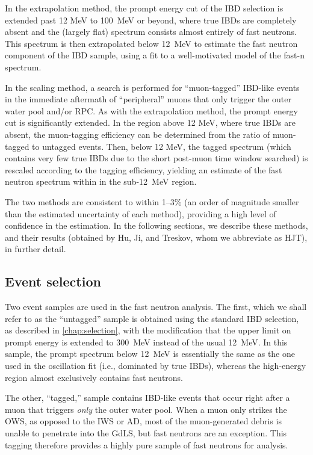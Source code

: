 \documentclass[../thesis.tex]{subfiles}
\begin{document}
In the extrapolation method, the prompt energy cut of the IBD selection is
extended past 12 MeV to 100~MeV or beyond, where true IBDs are completely absent
and the (largely flat) spectrum consists almost entirely of fast neutrons. This
spectrum is then extrapolated below 12~MeV to estimate the fast neutron
component of the IBD sample, using a fit to a well-motivated model of the fast-n
spectrum.

In the scaling method, a search is performed for ``muon-tagged'' IBD-like events
in the immediate aftermath of ``peripheral'' muons that only trigger the outer
water pool and/or RPC. As with the extrapolation method, the prompt energy cut
is significantly extended. In the region above 12 MeV, where true IBDs are
absent, the muon-tagging efficiency can be determined from the ratio of
muon-tagged to untagged events. Then, below 12 MeV, the tagged spectrum (which
contains very few true IBDs due to the short post-muon time window searched) is
rescaled according to the tagging efficiency, yielding an estimate of the fast
neutron spectrum within in the sub-12~MeV region.

The two methods are consistent to within 1--3\% (an order of magnitude smaller
than the estimated uncertainty of each method), providing a high level of
confidence in the estimation. In the following sections, we describe these
methods, and their results (obtained by Hu, Ji, and Treskov, whom we abbreviate
as HJT), in further detail.

\subsection{Event selection}
\label{sec:fastn_sel}

Two event samples are used in the fast neutron analysis. The first, which we
shall refer to as the ``untagged'' sample is obtained using the standard IBD
selection, as described in \autoref{chap:selection}, with the modification that
the upper limit on prompt energy is extended to 300~MeV instead of the usual
12~MeV. In this sample, the prompt spectrum below 12~MeV is essentially the same
as the one used in the oscillation fit (i.e., dominated by true IBDs), whereas
the high-energy region almost exclusively contains fast neutrons.

The other, ``tagged,'' sample contains IBD-like events that occur right after a
muon that triggers \emph{only} the outer water pool. When a muon only strikes
the OWS, as opposed to the IWS or AD, most of the muon-generated debris is
unable to penetrate into the GdLS, but fast neutrons are an exception. This
tagging therefore provides a highly pure sample of fast neutrons for analysis.
\end{document}
